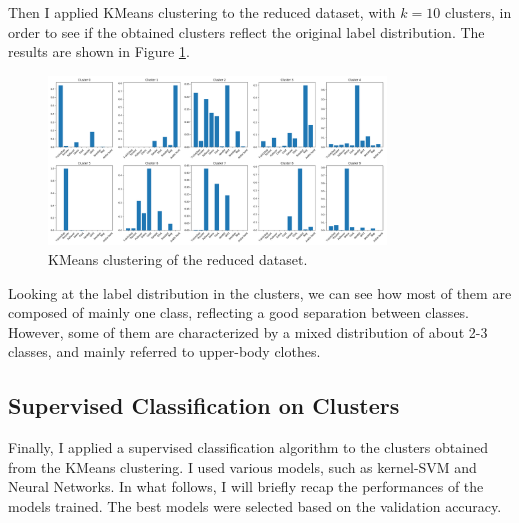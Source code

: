 \documentclass[a4paper, 10pt]{article}
\begin{document}
Then I applied KMeans clustering to the reduced dataset, with $k = 10$ clusters, in order to see if the obtained clusters reflect the original label distribution.
The results are shown in Figure \ref{fig:kmeans}.
\begin{figure}[ht]
    \centering
    \includegraphics[width=0.8\textwidth]{images/kmeans.png}
    \caption{KMeans clustering of the reduced dataset.}
    \label{fig:kmeans}
\end{figure}
Looking at the label distribution in the clusters, we can see how most of them are composed of mainly one class, reflecting a good separation between classes.
However, some of them are characterized by a mixed distribution of about 2-3 classes, and mainly referred to upper-body clothes.

\subsection{Supervised Classification on Clusters}
Finally, I applied a supervised classification algorithm to the clusters obtained from the KMeans clustering. I used various models, such as kernel-SVM and Neural Networks.
In what follows, I will briefly recap the performances of the models trained. The best models were selected based on the validation accuracy.
\end{document}
